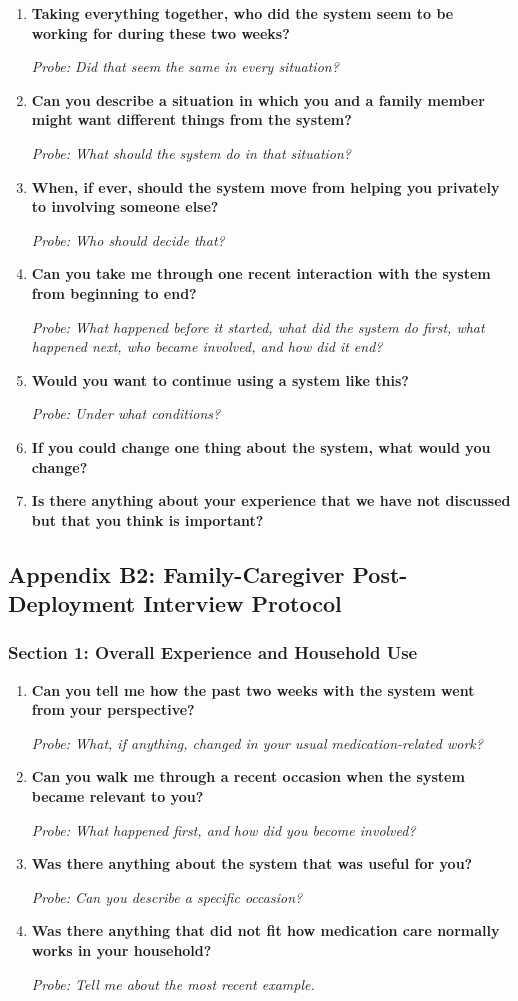 \begin{enumerate}[resume]
  \item \textbf{Taking everything together, who did the system seem to be working for during these two weeks?}

  \textit{Probe: Did that seem the same in every situation?}
  \item \textbf{Can you describe a situation in which you and a family member might want different things from the system?}

  \textit{Probe: What should the system do in that situation?}
  \item \textbf{When, if ever, should the system move from helping you privately to involving someone else?}

  \textit{Probe: Who should decide that?}
  \item \textbf{Can you take me through one recent interaction with the system from beginning to end?}

  \textit{Probe: What happened before it started, what did the system do first, what happened next, who became involved, and how did it end?}
  \item \textbf{Would you want to continue using a system like this?}

  \textit{Probe: Under what conditions?}
  \item \textbf{If you could change one thing about the system, what would you change?}
  \item \textbf{Is there anything about your experience that we have not discussed but that you think is important?}
\end{enumerate}

\subsection{Appendix B2: Family-Caregiver Post-Deployment Interview Protocol}

\subsubsection{Section 1: Overall Experience and Household Use}

\begin{enumerate}
  \item \textbf{Can you tell me how the past two weeks with the system went from your perspective?}

  \textit{Probe: What, if anything, changed in your usual medication-related work?}
  \item \textbf{Can you walk me through a recent occasion when the system became relevant to you?}

  \textit{Probe: What happened first, and how did you become involved?}
  \item \textbf{Was there anything about the system that was useful for you?}

  \textit{Probe: Can you describe a specific occasion?}
  \item \textbf{Was there anything that did not fit how medication care normally works in your household?}

  \textit{Probe: Tell me about the most recent example.}
\end{enumerate}

